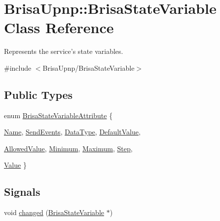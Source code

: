 \hypertarget{classBrisaUpnp_1_1BrisaStateVariable}{
\section{BrisaUpnp::BrisaStateVariable Class Reference}
\label{classBrisaUpnp_1_1BrisaStateVariable}
}


Represents the service's state variables.  


{\ttfamily \#include $<$BrisaUpnp/BrisaStateVariable$>$}\subsection*{Public Types}
\begin{DoxyCompactItemize}
\item 
enum \hyperlink{classBrisaUpnp_1_1BrisaStateVariable_af6afe40d25c8990351bc7205dada3249}{BrisaStateVariableAttribute} \{ \par
\hyperlink{classBrisaUpnp_1_1BrisaStateVariable_af6afe40d25c8990351bc7205dada3249a69b2ecca63cfd9601887ccac7b8e5482}{Name}, 
\hyperlink{classBrisaUpnp_1_1BrisaStateVariable_af6afe40d25c8990351bc7205dada3249ab15cbdf7c7633f953d68acf00e581ab0}{SendEvents}, 
\hyperlink{classBrisaUpnp_1_1BrisaStateVariable_af6afe40d25c8990351bc7205dada3249afd0614c2fde35eb8467dc69168583783}{DataType}, 
\hyperlink{classBrisaUpnp_1_1BrisaStateVariable_af6afe40d25c8990351bc7205dada3249a9f1906682237c18bdccba6e085b2ba5b}{DefaultValue}, 
\par
\hyperlink{classBrisaUpnp_1_1BrisaStateVariable_af6afe40d25c8990351bc7205dada3249afa7beed7754ad334dfb54dd5cc47afc7}{AllowedValue}, 
\hyperlink{classBrisaUpnp_1_1BrisaStateVariable_af6afe40d25c8990351bc7205dada3249aa3ff1c67ac1b88101fa617684fa61fcc}{Minimum}, 
\hyperlink{classBrisaUpnp_1_1BrisaStateVariable_af6afe40d25c8990351bc7205dada3249a38a169ce5fe362a38da6b5d528e9f0c4}{Maximum}, 
\hyperlink{classBrisaUpnp_1_1BrisaStateVariable_af6afe40d25c8990351bc7205dada3249a431b5870d1ecb0d44e5289e2eb8ddfcc}{Step}, 
\par
\hyperlink{classBrisaUpnp_1_1BrisaStateVariable_af6afe40d25c8990351bc7205dada3249a23a2eccc2f06e56408e6d4af003e2e8d}{Value}
 \}
\end{DoxyCompactItemize}
\subsection*{Signals}
\begin{DoxyCompactItemize}
\item 
void \hyperlink{classBrisaUpnp_1_1BrisaStateVariable_a3d606a92019f38c88d6cb27afc21814c}{changed} (\hyperlink{classBrisaUpnp_1_1BrisaStateVariable}{BrisaStateVariable} $\ast$)
\end{DoxyCompactItemize}
